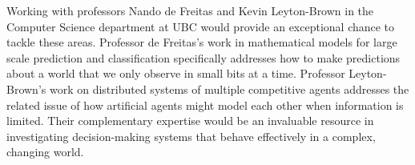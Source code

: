 \documentclass[12pt]{article}
\begin{document}
Working with professors Nando de Freitas and Kevin Leyton-Brown in the Computer Science department at UBC would provide an exceptional chance to tackle these areas. Professor de Freitas's work in mathematical models for large scale prediction and classification specifically addresses  how to make predictions about a world that we only observe in small bits at a time. Professor Leyton-Brown's work on distributed systems of multiple competitive agents addresses the related issue of how artificial agents might model each other when information is limited.  Their complementary expertise would be an invaluable resource in investigating  decision-making systems that behave effectively in a complex, changing world.  






\pagebreak





\end{document}
